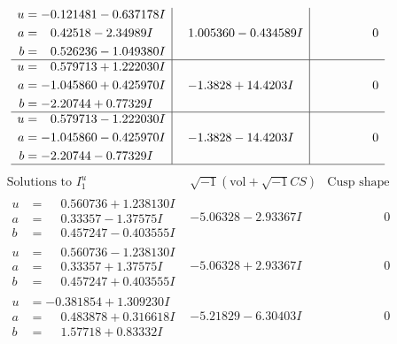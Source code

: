 \documentclass[1p]{elsarticle_modified}
\theoremstyle{definition}
\newcommand{\I}{\sqrt{-1}}
\begin{document}
$$\begin{array}{c|c|c}
\begin{aligned}
u &= -0.121481 - 0.637178 I \\
a &= \phantom{-}0.42518 - 2.34989 I \\
b &= \phantom{-}0.526236 - 1.049380 I\end{aligned}
 & \phantom{-}1.005360 - 0.434589 I & \phantom{-0.000000 } 0 \\ \hline\begin{aligned}
u &= \phantom{-}0.579713 + 1.222030 I \\
a &= -1.045860 + 0.425970 I \\
b &= -2.20744 + 0.77329 I\end{aligned}
 & -1.3828 + 14.4203 I & \phantom{-0.000000 } 0 \\ \hline\begin{aligned}
u &= \phantom{-}0.579713 - 1.222030 I \\
a &= -1.045860 - 0.425970 I \\
b &= -2.20744 - 0.77329 I\end{aligned}
 & -1.3828 - 14.4203 I & \phantom{-0.000000 } 0\\
 \hline 
 \end{array}$$\newpage$$\begin{array}{c|c|c}  
\text{Solutions to }I^u_{1}& \I (\text{vol} + \sqrt{-1}CS) & \text{Cusp shape}\\
 \hline 
\begin{aligned}
u &= \phantom{-}0.560736 + 1.238130 I \\
a &= \phantom{-}0.33357 - 1.37575 I \\
b &= \phantom{-}0.457247 - 0.403555 I\end{aligned}
 & -5.06328 - 2.93367 I & \phantom{-0.000000 } 0 \\ \hline\begin{aligned}
u &= \phantom{-}0.560736 - 1.238130 I \\
a &= \phantom{-}0.33357 + 1.37575 I \\
b &= \phantom{-}0.457247 + 0.403555 I\end{aligned}
 & -5.06328 + 2.93367 I & \phantom{-0.000000 } 0 \\ \hline\begin{aligned}
u &= -0.381854 + 1.309230 I \\
a &= \phantom{-}0.483878 + 0.316618 I \\
b &= \phantom{-}1.57718 + 0.83332 I\end{aligned}
 & -5.21829 - 6.30403 I & \phantom{-0.000000 } 0 \\ \hline\begin{aligned}

\end{aligned}
\end{array}$$
\end{document}
